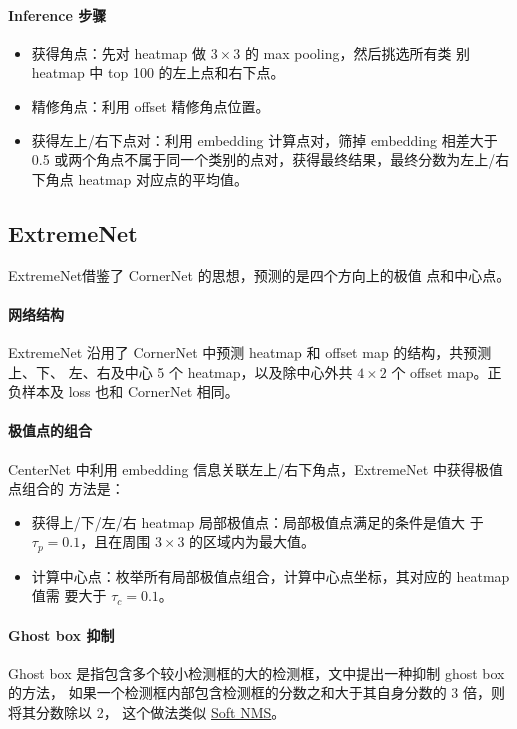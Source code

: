 \paragraph{Inference 步骤}
\begin{itemize}
  \item 获得角点：先对 heatmap 做 $3 \times 3$ 的 max pooling，然后挑选所有类
    别 heatmap 中 top 100 的左上点和右下点。
  \item 精修角点：利用 offset 精修角点位置。
  \item 获得左上/右下点对：利用 embedding 计算点对，筛掉 embedding 相差大于 0.5
    或两个角点不属于同一个类别的点对，获得最终结果，最终分数为左上/右下角点
    heatmap 对应点的平均值。
\end{itemize}

\subsection{ExtremeNet}
\label{sec:ExtremeNet}
ExtremeNet借鉴了 CornerNet 的思想，预测的是四个方向上的极值
点和中心点。

\paragraph{网络结构}
ExtremeNet 沿用了 CornerNet 中预测 heatmap 和 offset map 的结构，共预测上、下、
左、右及中心 5 个 heatmap，以及除中心外共 $4 \times 2$ 个 offset map。正负样本及
loss 也和 CornerNet 相同。

\paragraph{极值点的组合}
CenterNet 中利用 embedding 信息关联左上/右下角点，ExtremeNet 中获得极值点组合的
方法是：

\begin{itemize}
  \item 获得上/下/左/右 heatmap 局部极值点：局部极值点满足的条件是值大
    于 $\tau_p=0.1$，且在周围 $3 \times 3$ 的区域内为最大值。
  \item 计算中心点：枚举所有局部极值点组合，计算中心点坐标，其对应的 heatmap 值需
    要大于 $\tau_c=0.1$。
\end{itemize}

\paragraph{Ghost box 抑制}
Ghost box 是指包含多个较小检测框的大的检测框，文中提出一种抑制 ghost box 的方法，
如果一个检测框内部包含检测框的分数之和大于其自身分数的 3 倍，则将其分数除以 2，
这个做法类似 \hyperref[subsec:soft-nms]{Soft NMS}。

